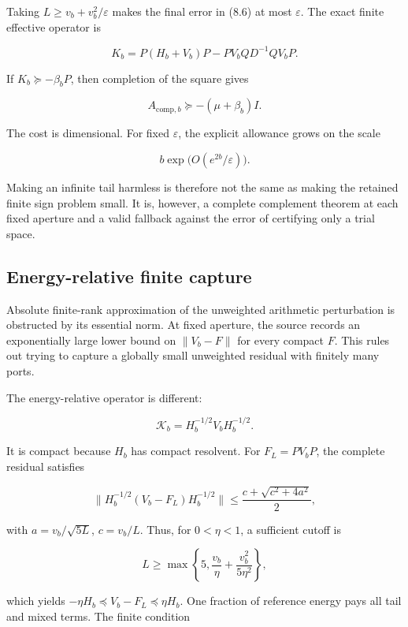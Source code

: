 \documentclass[
  10pt,
  a4paper,
  10pt,
  oneside,
  openany]{book}
\begin{document}
Taking \(L\ge v_b+v_b^2/\varepsilon\) makes the final error in (8.6) at
most \(\varepsilon\). The exact finite effective operator is

\[
K_b=P(H_b+V_b)P-PV_bQD^{-1}QV_bP.
\tag{8.7}\label{eq:8.7}
\]

If \(K_b\succeq-\beta_bP\), then completion of the square gives

\[
A_{\mathrm{comp},b}\succeq-(\mu+\beta_b)I.
\tag{8.8}\label{eq:8.8}
\]

The cost is dimensional. For fixed \(\varepsilon\), the explicit
allowance grows on the scale

\[
b\exp\!\bigl(O(e^{2b}/\varepsilon)\bigr).
\tag{8.9}\label{eq:8.9}
\]

Making an infinite tail harmless is therefore not the same as making the
retained finite sign problem small. It is, however, a complete
complement theorem at each fixed aperture and a valid fallback against
the error of certifying only a trial space.

\subsection{Energy-relative finite
capture}\label{energy-relative-finite-capture}

Absolute finite-rank approximation of the unweighted arithmetic
perturbation is obstructed by its essential norm. At fixed aperture, the
source records an exponentially large lower bound on \(\|V_b-F\|\) for
every compact \(F\). This rules out trying to capture a globally small
unweighted residual with finitely many ports.

The energy-relative operator is different:

\[
\mathcal K_b=H_b^{-1/2}V_bH_b^{-1/2}.
\tag{8.10}\label{eq:8.10}
\]

It is compact because \(H_b\) has compact resolvent. For \(F_L=PV_bP\),
the complete residual satisfies

\[
\|H_b^{-1/2}(V_b-F_L)H_b^{-1/2}\|
\le\frac{c+\sqrt{c^2+4a^2}}2,
\tag{8.11}\label{eq:8.11}
\]

with \(a=v_b/\sqrt{5L}\), \(c=v_b/L\). Thus, for \(0<\eta<1\), a
sufficient cutoff is

\[
L\ge\max\left\{5,\frac{v_b}{\eta}+\frac{v_b^2}{5\eta^2}\right\},
\tag{8.12}\label{eq:8.12}
\]

which yields \(-\eta H_b\preceq V_b-F_L\preceq\eta H_b\). One fraction
of reference energy pays all tail and mixed terms. The finite condition
\end{document}
